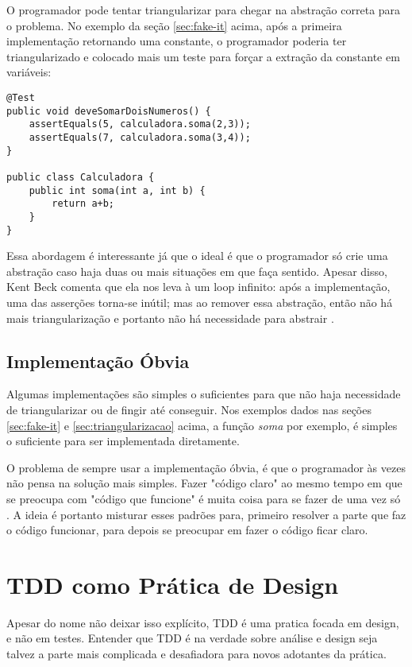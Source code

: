 O programador pode tentar triangularizar para chegar na abstração correta para o problema. No exemplo da seção \ref{sec:fake-it} acima, 
após a primeira implementação retornando uma constante, o programador poderia ter triangularizado e colocado mais um teste para
forçar a extração da constante em variáveis:

\begin{lstlisting}[frame=trbl]
@Test
public void deveSomarDoisNumeros() {
	assertEquals(5, calculadora.soma(2,3));
	assertEquals(7, calculadora.soma(3,4));
}

public class Calculadora {
	public int soma(int a, int b) {
		return a+b;
	}
}
\end{lstlisting}

Essa abordagem é interessante já que o ideal é que o programador só crie uma abstração caso haja duas ou mais situações em que
faça sentido. Apesar disso, Kent Beck comenta que ela nos leva à um loop infinito: após a implementação, uma das asserções torna-se
inútil; mas ao remover essa abstração, então não há mais triangularização e portanto não há necessidade para abstrair \cite{TDDByExample}.

\subsection{Implementação Óbvia}

Algumas implementações são simples o suficientes para que não haja necessidade de triangularizar ou de fingir até conseguir. Nos exemplos
dados nas seções \ref{sec:fake-it} e \ref{sec:triangularizacao} acima, a função \textit{soma} por exemplo, é simples o suficiente para
ser implementada diretamente.

O problema de sempre usar a implementação óbvia, é que o programador às vezes não pensa na solução mais simples. Fazer "código claro" ao
mesmo tempo em que se preocupa com "código que funcione" é muita coisa para se fazer de uma vez só \cite{TDDByExample}. A ideia é portanto
misturar esses padrões para, primeiro resolver a parte que faz o código funcionar, para depois se preocupar em fazer o código ficar claro.

\section{TDD como Prática de Design}
\label{sec:tdd-e-design}

Apesar do nome não deixar isso explícito, TDD é uma pratica focada em design, e não em testes.
Entender que TDD é na verdade sobre análise e design seja talvez a parte mais complicada e desafiadora para novos adotantes da prática. 

